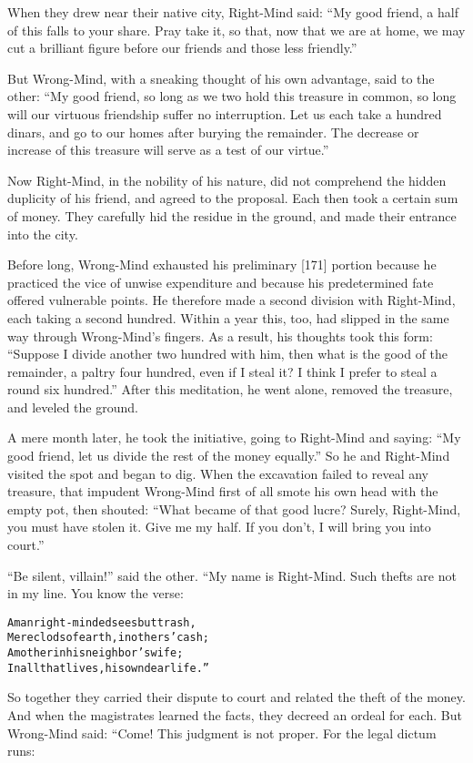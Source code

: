 \documentclass{article}
\renewenvironment{verbatim}{\begin{alltt}\normalfont\begin{centering}}{\end{centering}\end{alltt}}
\begin{document}
When they drew near their native city, Right-Mind said:
``My good friend, a half of this falls to your share. Pray take it, so that, now that we are at home, we may cut a brilliant figure before our friends and those less friendly.''

But Wrong-Mind, with a sneaking thought of his own advantage, said
to the other:
``My good friend, so long as we two hold this treasure in common, so long will our virtuous friendship suffer no interruption. Let us each take a hundred dinars, and go to our homes after burying the remainder. The decrease or increase of this treasure will serve as a test of our virtue.''

Now Right-Mind, in the nobility of his nature, did not comprehend
the hidden duplicity of his friend, and agreed to the proposal.
Each then took a certain sum of money. They carefully hid the
residue in the ground, and made their entrance into the city.

Before long, Wrong-Mind exhausted his preliminary [171] portion
because he practiced the vice of unwise expenditure and because his
predetermined fate offered vulnerable points. He therefore made a
second division with Right-Mind, each taking a second hundred.
Within a year this, too, had slipped in the same way through
Wrong-Mind's fingers. As a result, his thoughts took this form:
``Suppose I divide another two hundred with him, then what is the good of the remainder, a paltry four hundred, even if I steal it? I think I prefer to steal a round six hundred.''
After this meditation, he went alone, removed the treasure, and
leveled the ground.

A mere month later, he took the initiative, going to Right-Mind and
saying:
``My good friend, let us divide the rest of the money equally.'' So
he and Right-Mind visited the spot and began to dig. When the
excavation failed to reveal any treasure, that impudent Wrong-Mind
first of all smote his own head with the empty pot, then shouted:
``What became of that good lucre? Surely, Right-Mind, you must have stolen it. Give me my half. If you don't, I will bring you into court.''

``Be silent, villain!'' said the other. “My name is Right-Mind.
Such thefts are not in my line. You know the verse:

\begin{verbatim}
A man right-minded sees but trash,
Mere clods of earth, in others' cash;
A mother in his neighbor's wife;
In all that lives, his own dear life.”
\end{verbatim}
So together they carried their dispute to court and related the
theft of the money. And when the magistrates learned the facts,
they decreed an ordeal for each. But Wrong-Mind said: “Come! This
judgment is not proper. For the legal dictum runs:
\end{document}
